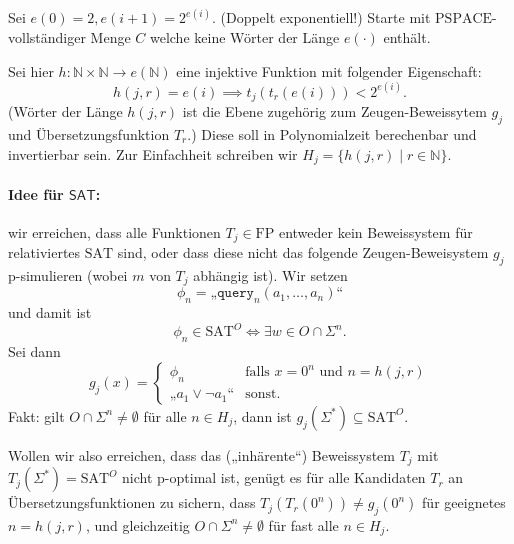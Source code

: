 \documentclass[nofonts]{uebung}
\def\FP{\ensuremath{\mathrm{FP}}}
\def\SAT{\ensuremath{\mathrm{SAT}}}
\def\hSAT{\ensuremath{\mathsf{SAT}}}
\begin{document}
Sei $e(0)=2, e(i+1)=2^{e(i)}$. (Doppelt exponentiell!)
Starte mit $\mathrm{PSPACE}$-vollständiger Menge $C$ welche keine Wörter der Länge $e(\cdot)$ enthält.

Sei hier $h\colon \mathbb N\times \mathbb N\to e(\mathbb N)$ eine injektive Funktion mit folgender Eigenschaft:
\[ h(j,r)=e(i) \implies t_j(t_r(e(i))) < 2^{e(i)}. \]
(Wörter der Länge $h(j,r)$ ist die Ebene zugehörig zum Zeugen-Beweissytem $g_j$ und Übersetzungsfunktion $T_r$.)
Diese soll in Polynomialzeit berechenbar und invertierbar sein.
Zur Einfachheit schreiben wir $H_j = \{ h(j,r) \mid r\in\mathbb N\}$.


\paragraph{Idee für $\hSAT$:} wir erreichen, dass alle Funktionen $T_j\in\FP$ entweder kein Beweissystem für relativiertes $\mathrm{SAT}$ sind, oder dass diese nicht das folgende Zeugen-Beweisystem $g_j$ p-simulieren (wobei $m$ von $T_j$ abhängig ist).
Wir setzen
\[ \phi_n = „\texttt{query}_n(a_1, \dots, a_n)“ \]
und damit ist
\[ \phi_n \in \SAT^O \iff \exists w\in O\cap \Sigma^n. \]
Sei dann
\[ g_j(x) = \begin{cases} \phi_n & \text{falls $x=0^n$ und $n=h(j,r)$} \\ „a_1 \lor \neg a_1“ & \text{sonst}. \end{cases}\]
Fakt: gilt $O\cap \Sigma^n\neq \emptyset$ für alle $n\in H_j$, dann ist $g_j(\Sigma^*)\subseteq \mathrm{SAT}^O$.

Wollen wir also erreichen, dass das („inhärente“) Beweissystem $T_j$ mit $T_j(\Sigma^*)=\mathrm{SAT}^O$ nicht p-optimal ist, genügt es für alle Kandidaten $T_r$ an Übersetzungsfunktionen zu sichern, dass $T_j(T_r(0^n))\neq g_j(0^n)$ für geeignetes $n=h(j,r)$, und gleichzeitig $O\cap \Sigma^n\neq \emptyset$ für fast alle $n\in H_j$.
\end{document}
